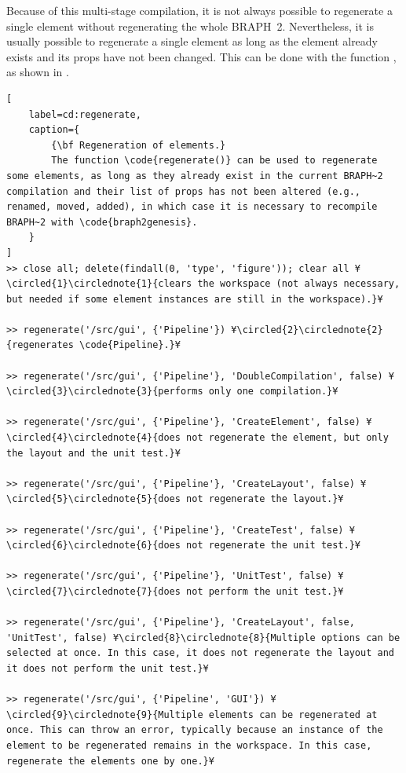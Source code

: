 \documentclass{tufte-handout}
\begin{document}
Because of this multi-stage compilation, it is not always possible to regenerate a single element without regenerating the whole BRAPH~2. 
Nevertheless, it is usually possible to regenerate a single element as long as the element already exists and its props have not been changed.
This can be done with the function , as shown in .

\begin{lstlisting}[
	label=cd:regenerate,
	caption={
		{\bf Regeneration of elements.}
		The function \code{regenerate()} can be used to regenerate some elements, as long as they already exist in the current BRAPH~2 compilation and their list of props has not been altered (e.g., renamed, moved, added), in which case it is necessary to recompile BRAPH~2 with \code{braph2genesis}.
	}
]
>> close all; delete(findall(0, 'type', 'figure')); clear all ¥\circled{1}\circlednote{1}{clears the workspace (not always necessary, but needed if some element instances are still in the workspace).}¥

>> regenerate('/src/gui', {'Pipeline'}) ¥\circled{2}\circlednote{2}{regenerates \code{Pipeline}.}¥

>> regenerate('/src/gui', {'Pipeline'}, 'DoubleCompilation', false) ¥\circled{3}\circlednote{3}{performs only one compilation.}¥

>> regenerate('/src/gui', {'Pipeline'}, 'CreateElement', false) ¥\circled{4}\circlednote{4}{does not regenerate the element, but only the layout and the unit test.}¥

>> regenerate('/src/gui', {'Pipeline'}, 'CreateLayout', false) ¥\circled{5}\circlednote{5}{does not regenerate the layout.}¥

>> regenerate('/src/gui', {'Pipeline'}, 'CreateTest', false) ¥\circled{6}\circlednote{6}{does not regenerate the unit test.}¥

>> regenerate('/src/gui', {'Pipeline'}, 'UnitTest', false) ¥\circled{7}\circlednote{7}{does not perform the unit test.}¥

>> regenerate('/src/gui', {'Pipeline'}, 'CreateLayout', false, 'UnitTest', false) ¥\circled{8}\circlednote{8}{Multiple options can be selected at once. In this case, it does not regenerate the layout and it does not perform the unit test.}¥

>> regenerate('/src/gui', {'Pipeline', 'GUI'}) ¥\circled{9}\circlednote{9}{Multiple elements can be regenerated at once. This can throw an error, typically because an instance of the element to be regenerated remains in the workspace. In this case, regenerate the elements one by one.}¥
\end{lstlisting}
\end{document}
